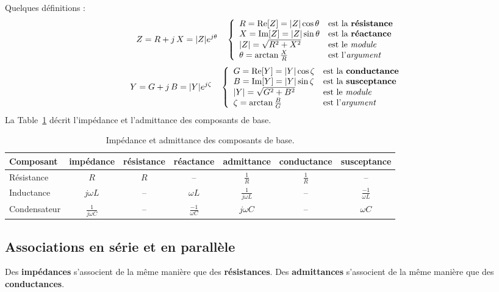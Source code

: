Quelques définitions : 
\[Z=R+j\, X = |Z|e^{j\theta}\quad 
\left\{
\begin{array}{ll}
R = \text{Re}[Z] = |Z|\cos \theta & \text{est la {\bf résistance}}\\
X = \text{Im}[Z] = |Z|\sin \theta & \text{est la {\bf réactance}}\\
|Z| = \sqrt{R^2+X^2} & \text{est le {\em module}}\\
\theta = \arctan \frac{X}{R} & \text{est l'{\em argument}}
\end{array}\right. \]
\[Y=G+j\, B = |Y|e^{j\zeta} \quad
\left\{\begin{array}{ll}
G = \text{Re}[Y] = |Y|\cos \zeta & \text{est la {\bf conductance}}\\
B = \text{Im}[Y] = |Y|\sin \zeta & \text{est la {\bf susceptance}}\\
|Y| = \sqrt{G^2+B^2} & \text{est le {\em module}}\\
\zeta = \arctan \frac{B}{G} & \text{est l'{\em argument}}\\
\end{array}\right.\]
La Table~\ref{tab:ZY} décrit l'impédance et l'admittance des composants de base.


\begin{table}[ht]
\caption{Impédance et admittance des composants de base. \label{tab:ZY}}
\begin{center}
	\begin{tabular}{l|ccc|ccc}
		Composant & impédance & résistance & réactance & admittance &
		conductance & susceptance \\ \hline
		Résistance & $R$ & $R$ & -- & $\frac{1}{R}$ &   $\frac{1}{R}$ & --\\
		Inductance & $j\omega L$ & -- & $\omega L$ & $\frac{1}{j\omega L}$ &
		-- & $\frac{-1}{\omega L}$\\
		Condensateur & $\frac{1}{j\omega C}$ & -- & $\frac{-1}{\omega C}$ 
		& $j\omega C$ & -- &  $\omega C$
	\end{tabular}
\end{center}
\end{table}


\subsection{Associations en série et en parallèle}

Des \textbf{impédances} s'associent de la même manière que des \textbf{résistances}.
Des \textbf{admittances} s'associent de la même manière que des \textbf{conductances}.

